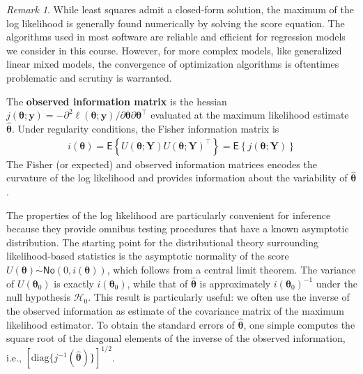 \documentclass[
  11pt,
  letterpaper,
]{book}
\theoremstyle{definition}
\theoremstyle{definition}
\theoremstyle{definition}
\theoremstyle{definition}
\theoremstyle{remark}
\newtheorem*{remark}{Remark}
\begin{document}
\begin{remark}
While least squares admit a closed-form solution, the maximum of the log likelihood is generally found numerically by solving the score equation. The algorithms used in most software are reliable and efficient for regression models we consider in this course. However, for more complex models, like generalized linear mixed models, the convergence of optimization algorithms is oftentimes problematic and scrutiny is warranted.
\end{remark}

The \textbf{observed information matrix} is the hessian \(j(\boldsymbol{\theta}; \boldsymbol{y})=-\partial^2 \ell(\boldsymbol{\theta}; \boldsymbol{y})/\partial \boldsymbol{\theta} \partial \boldsymbol{\theta}^\top\) evaluated at the maximum likelihood estimate \(\widehat{\boldsymbol{\theta}}\).
Under regularity conditions, the Fisher information matrix is
\begin{align*}
i(\boldsymbol{\theta}) = \mathsf{E}\left\{U(\boldsymbol{\theta}; \boldsymbol{Y}) U(\boldsymbol{\theta}; \boldsymbol{Y})^\top\right\} = \mathsf{E}\left\{j(\boldsymbol{\theta}; \boldsymbol{Y})\right\}
\end{align*}
The Fisher (or expected) and observed information matrices encodes the curvature of the log likelihood and provides information about the variability of \(\widehat{\boldsymbol{\theta}}\).

The properties of the log likelihood are particularly convenient for inference because they provide omnibus testing procedures that have a known asymptotic distribution. The starting point for the distributional theory surrounding likelihood-based statistics is the asymptotic normality of the score \(U(\boldsymbol{\theta}) \stackrel{\cdot}{\sim}\mathsf{No}(0, i(\boldsymbol{\theta}))\), which follows from a central limit theorem. The variance of \(U(\boldsymbol{\theta}_0)\) is exactly \(i(\boldsymbol{\theta}_0)\), while that of \(\widehat{\boldsymbol{\theta}}\) is approximately \(i(\boldsymbol{\theta}_0)^{-1}\) under the null hypothesis \(\mathscr{H}_0\). This result is particularly useful: we often use the inverse of the observed information as estimate of the covariance matrix of the maximum likelihood estimator. To obtain the standard errors of \(\widehat{\boldsymbol{\theta}}\), one simple computes the square root of the diagonal elements of the inverse of the observed information, i.e., \([\mathrm{diag}\{j^{-1}(\widehat{\boldsymbol{\theta}})\}]^{1/2}\).
\end{document}
